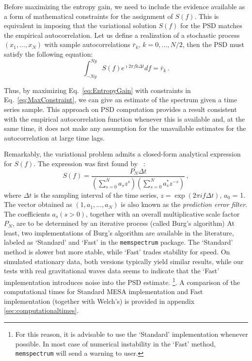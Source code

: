 \documentclass[epj,nopacs]{svjour}
\begin{document}
Before maximizing the entropy gain, we need to include the evidence available as a form of mathematical constraints for the assignment of $S(f)$.
This is equivalent in imposing that the variational solution $S(f)$ for the PSD matches the empirical autocorrelation.
Let us define a realization of a stochastic process $(x_1,\ldots,x_N)$ with sample autocorrelations $\bar r_k,\,k=0,\ldots, N/2$, then the PSD must satisfy the following equation:
\begin{equation}\label{eq:MaxConstraint}
\int_{-Ny}^{Ny} S(f) e^{\imath 2 \pi f k \Delta t} df = \bar r_{k}\,.
\end{equation}

Thus, by maximizing Eq.~\eqref{eq:EntropyGain} with constraints in Eq.~\eqref{eq:MaxConstraint}, we can give an estimate of the spectrum given a time series sample.
This approach on PSD computation provides a result consistent with the empirical autocorrelation function whenever this is available and, at the same time, it does not make any assumption for the unavailable estimates for the autocorrelation at large time lags.

Remarkably, the variational problem admits a closed-form analytical expression for $S(f)$.
The expression was first found by ~\cite{burg1975maximum}:
\begin{equation}\label{eq:MESApsd}
    S(f) = \frac{P_N \Delta t}{\left(\sum_{s=0}^{N} a_s z^s\right)\left(\sum_{s = 0}^N a^*_s z^{-s}\right)}\,,
\end{equation}
where $\Delta t$ is the sampling interval of the time series, $z=\exp{(2\pi i f\Delta t)}$, $a_0$ = 1.
The vector obtained as $(1, a_1, \dots, a_N)$ is also known as the \textit{prediction error filter}.
The coefficients $a_s (s > 0)$, together with an overall multiplicative scale factor $P_N$, are to be determined by an iterative process (called Burg's algorithm)
At least, two implementations of Burg's algorithm are available in the literature, labeled as `Standard' and `Fast' in the \texttt{memspectrum} package. The `Standard' method is slower but more stable, while `Fast' trades stability for speed.
On simulated stationary data, both versions typically yield similar results, while our tests with real gravitational waves data seems to indicate that the `Fast' implementation introduces noise into the PSD estimate. \footnote{For this reason, it is advisable to use the `Standard' implementation whenever possible. In most case of numerical instability in the `Fast' method, \texttt{memspectrum} will send a warning to user.}. A comparison of the computational times for Standard MESA implementation and Fast implementation (together with Welch's) is provided in appendix \ref{sec:computationaltimes}.
\end{document}
